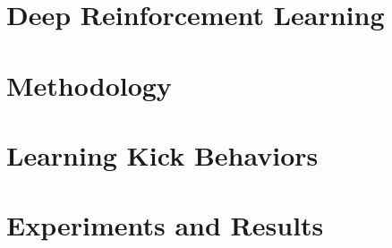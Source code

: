 \documentclass[tg, eng]{ita}    %
\begin{document}
%

\chapter{Deep Reinforcement Learning}
\label{chap:deep_rl}


\chapter{Methodology}
\label{chap:method}


\chapter{Learning Kick Behaviors}
\label{chap:contributions}


\chapter{Experiments and Results}
\label{chap:experiments}


\renewcommand\bibname{\itareferencesnamebabel} %


%

%

\end{document}
